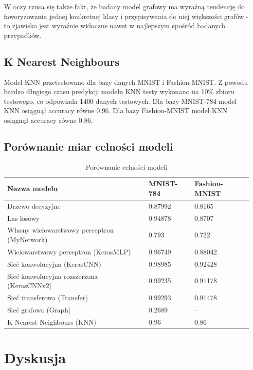 \documentclass{article}
\begin{document}
W oczy rzuca się także fakt, że badany model grafowy ma
wyraźną tendencję do faworyzowania jednej konkretnej klasy
i przypisywania do niej większości grafów - to zjawisko jest
wyraźnie widoczne nawet w najlepszym spośród badanych przypadków.

\subsection{K Nearest Neighbours}
Model KNN przetestowano dla bazy danych MNIST i Fashion-MNIST.
Z powodu bardzo długiego czasu predykcji modelu KNN testy wykonano na 10\% 
zbioru testowego, co odpowiada 1400 danych testowych.
Dla bazy MNIST-784 model KNN osiągnął accuracy równe $0.96$.
Dla bazy Fashion-MNIST model KNN osiągnął accuracy równe $0.86$.


\subsection{Porównanie miar celności modeli}

\begin{table}[H]
    \centering
    \begin{tabular}{| l | l | l |}
    \hline
    \textbf{Nazwa modelu} & \textbf{MNIST-784} & \textbf{Fashion-MNIST} \\
    \hline
    Drzewo decyzyjne & 0.87992 & 0.8165 \\
    \hline
    Las losowy & 0.94878 & 0.8707 \\
    \hline
    Własny wielowarstwowy perceptron (MyNetwork) & 0.793 & 0.722 \\
    \hline
    Wielowarstwowy perceptron (KerasMLP)  & 0.96749 & 0.88042 \\
    \hline
    Sieć konwolucyjna (KerasCNN) & 0.98985 & 0.92428 \\
    \hline
    Sieć konwolucyjna rozszerzona (KerasCNNv2) & 0.99235 & 0.91178 \\
    \hline
    Sieć transferowa (Transfer) & 0.99293 & 0.91478 \\
    \hline
    Sieć grafowa (Graph) & 0.2689 & -- \\
    \hline
    K Nearest Neighbours (KNN) & 0.96 & 0.86 \\
    \hline
    \end{tabular}
    \caption{Porównanie celności modeli}
\end{table}

\section{Dyskusja}
\end{document}
